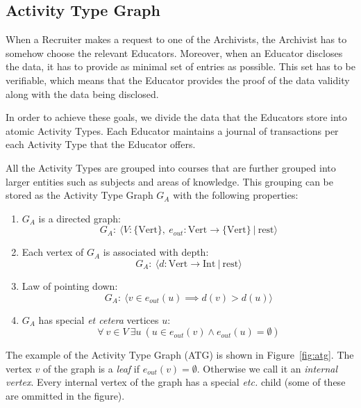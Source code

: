 \subsection{Activity Type Graph}
\label{sec:ATG}
When a Recruiter makes a request to one of the Archivists, the Archivist has to somehow choose the relevant Educators. Moreover, when an Educator discloses the data, it has to provide as minimal set of entries as possible. This set has to be verifiable, which means that the Educator provides the proof of the data validity along with the data being disclosed.

In order to achieve these goals, we divide the data that the Educators store into atomic Activity Types. Each Educator maintains a journal of transactions per each Activity Type that the Educator offers.

All the Activity Types are grouped into courses that are further grouped into larger entities such as subjects and areas of knowledge. This grouping can be stored as the Activity Type Graph $G_A$ with the following properties:
\begin{enumerate}[label=\arabic*${}^\circ$]
\item $G_A$ is a directed graph:
  \begin{equation}
  G_A:\ \langle V: \{\mathrm{Vert}\},\ e_{out}: \mathrm{Vert} \rightarrow \{\mathrm{Vert}\}\ |\ \mathrm{rest} \rangle
  \end{equation}

\item Each vertex of $G_A$ is associated with depth:
  \begin{equation}
  G_A:\ \langle d: \mathrm{Vert} \rightarrow \mathrm{Int}\ |\ \mathrm{rest}  \rangle
  \end{equation}

\item Law of pointing down:
  \begin{equation}
  G_A:\ \langle v \in e_{out}(u) \implies d(v) > d(u) \rangle
  \end{equation}

\item $G_A$ has special \textit{et cetera} vertices $u$:
  \begin{equation}
  \forall\ v \in V\ \exists u\ (u \in e_{out}(v) \land e_{out}(u) = \emptyset)
  \end{equation}
\end{enumerate}

The example of the Activity Type Graph (ATG) is shown in Figure~\ref{fig:atg}. The vertex $v$ of the graph is a \textit{leaf} if $e_{out}(v) = \emptyset$. Otherwise we call it an \textit{internal vertex}. Every internal vertex of the graph has a special \textit{etc.} child (some of these are ommitted in the figure).


